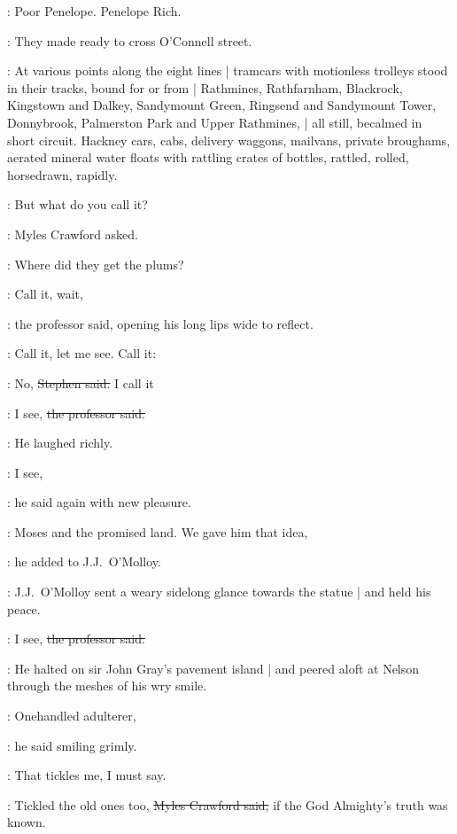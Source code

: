 \StephenInt:
Poor Penelope.
Penelope Rich.

:
They made ready to cross O'Connell street.



:
At various points along the eight lines |
tramcars with motionless trolleys stood in their tracks,
bound for or from |
Rathmines,
Rathfarnham,
Blackrock,
Kingstown and Dalkey,
Sandymount Green,
Ringsend and
Sandymount Tower,
Donnybrook,
Palmerston Park and Upper Rathmines, |
all still,
becalmed in short circuit.
Hackney cars,
cabs,
delivery
waggons,
mailvans,
private broughams,
aerated mineral water floats with rattling crates of bottles,
rattled,
rolled,
horsedrawn,
rapidly.




\crawford:
But what do you call it?

:
Myles Crawford asked.

\crawford:
Where did they get the plums?



\machugh:
Call it, wait,

:
the professor said,
opening his long lips wide to reflect.

\machugh:
Call it,
let me see.
Call it:

\Stephen:
No,
\sout{Stephen said.}
I call it

\machugh:
I see,
\sout{the professor said.}


:
He laughed richly.

\machugh:
I see,

:
he said again with new pleasure.

\machugh:
Moses and the promised land.
We gave him that idea,

:
he added to J.J.~O'Molloy.



:
J.J.~O'Molloy sent a weary sidelong glance towards the statue |
and held his peace.

\machugh:
I see,
\sout{the professor said.}

:
He halted on sir John Gray's pavement island |
and peered aloft at Nelson through the meshes of his wry smile.



\machugh:
Onehandled adulterer,

:
he said smiling grimly.

\machugh:
That tickles me, I must say.

\crawford:
Tickled the old ones too,
\sout{Myles Crawford said,}
if the God Almighty's truth was known.
